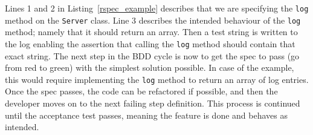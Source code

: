 Lines 1 and 2 in Listing~\ref{rspec_example} describes that we are specifying
the \texttt{log} method on the \texttt{Server} class. Line 3 describes the
intended behaviour of the \texttt{log} method; namely that it should return an
array. Then a test string is written to the log enabling the assertion that
calling the \texttt{log} method should contain that exact string. The next step
in the BDD cycle is now to get the spec to pass (go from red to green) with
the simplest solution possible. In case of the example, this would require
implementing the \texttt{log} method to return an array of log entries. Once
the spec passes, the code can be refactored if possible, and then the
developer moves on to the next failing step definition. This process is
continued until the acceptance test passes, meaning the feature is done and
behaves as intended.
